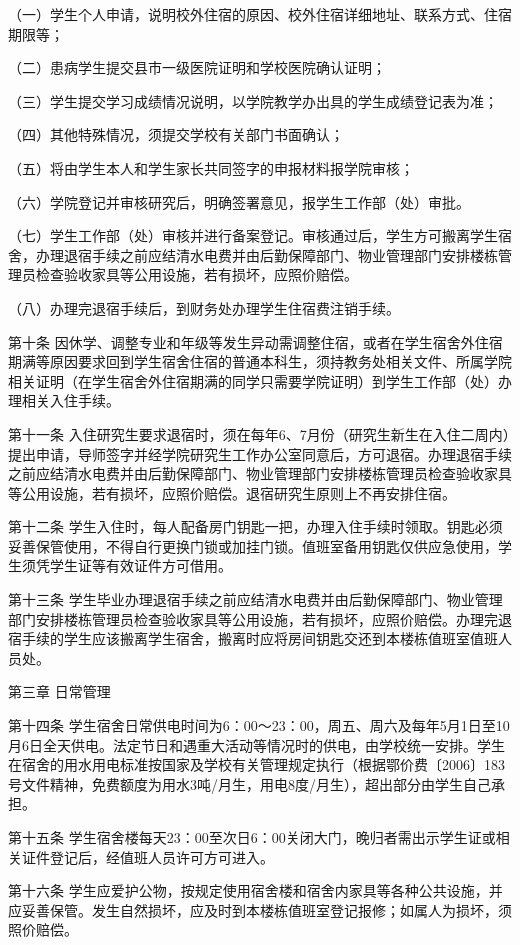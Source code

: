 \documentclass[UTF8,12pt,a4paper]{report}
\begin{document}
（一）学生个人申请，说明校外住宿的原因、校外住宿详细地址、联系方式、住宿期限等；

（二）患病学生提交县市一级医院证明和学校医院确认证明；

（三）学生提交学习成绩情况说明，以学院教学办出具的学生成绩登记表为准；

（四）其他特殊情况，须提交学校有关部门书面确认；

（五）将由学生本人和学生家长共同签字的申报材料报学院审核；

（六）学院登记并审核研究后，明确签署意见，报学生工作部（处）审批。

（七）学生工作部（处）审核并进行备案登记。审核通过后，学生方可搬离学生宿舍，办理退宿手续之前应结清水电费并由后勤保障部门、物业管理部门安排楼栋管理员检查验收家具等公用设施，若有损坏，应照价赔偿。

（八）办理完退宿手续后，到财务处办理学生住宿费注销手续。

第十条 因休学、调整专业和年级等发生异动需调整住宿，或者在学生宿舍外住宿期满等原因要求回到学生宿舍住宿的普通本科生，须持教务处相关文件、所属学院相关证明（在学生宿舍外住宿期满的同学只需要学院证明）到学生工作部（处）办理相关入住手续。

第十一条 入住研究生要求退宿时，须在每年6、7月份（研究生新生在入住二周内）提出申请，导师签字并经学院研究生工作办公室同意后，方可退宿。办理退宿手续之前应结清水电费并由后勤保障部门、物业管理部门安排楼栋管理员检查验收家具等公用设施，若有损坏，应照价赔偿。退宿研究生原则上不再安排住宿。

第十二条 学生入住时，每人配备房门钥匙一把，办理入住手续时领取。钥匙必须妥善保管使用，不得自行更换门锁或加挂门锁。值班室备用钥匙仅供应急使用，学生须凭学生证等有效证件方可借用。

第十三条 学生毕业办理退宿手续之前应结清水电费并由后勤保障部门、物业管理部门安排楼栋管理员检查验收家具等公用设施，若有损坏，应照价赔偿。办理完退宿手续的学生应该搬离学生宿舍，搬离时应将房间钥匙交还到本楼栋值班室值班人员处。

第三章 日常管理

第十四条 学生宿舍日常供电时间为6：00～23：00，周五、周六及每年5月1日至10月6日全天供电。法定节日和遇重大活动等情况时的供电，由学校统一安排。学生在宿舍的用水用电标准按国家及学校有关管理规定执行（根据鄂价费〔2006〕183号文件精神，免费额度为用水3吨/月生，用电8度/月生），超出部分由学生自己承担。

第十五条 学生宿舍楼每天23：00至次日6：00关闭大门，晚归者需出示学生证或相关证件登记后，经值班人员许可方可进入。

第十六条 学生应爱护公物，按规定使用宿舍楼和宿舍内家具等各种公共设施，并应妥善保管。发生自然损坏，应及时到本楼栋值班室登记报修；如属人为损坏，须照价赔偿。
\end{document}

